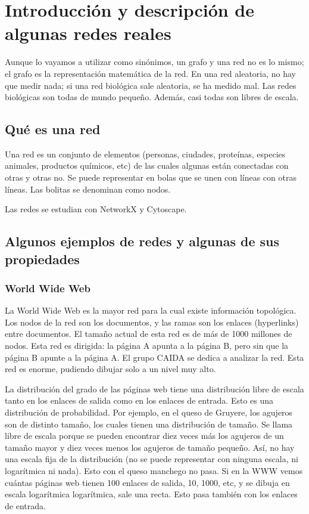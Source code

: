 \chapter{Introducción y descripción de algunas redes reales}
Aunque lo vayamos a utilizar como sinónimos, un grafo y una red no es lo mismo; el grafo es la representación matemática de la red. En una red aleatoria, no hay que medir nada; si una red biológica sale aleatoria, se ha medido mal. Las redes biológicas son todas de mundo pequeño. Además, casi todas son libres de escala. 

\section{Qué es una red}
Una red es un conjunto de elementos (personas, ciudades, proteínas, especies animales, productos químicos, etc) de las cuales algunas están conectadas con otras y otras no. Se puede representar en bolas que se unen con líneas con otras líneas. Las bolitas se denominan como nodos. 

Las redes se estudian con NetworkX y Cytoscape.

\section{Algunos ejemplos de redes y algunas de sus propiedades}
\subsection{World Wide Web}
La World Wide Web es la mayor red para la cual existe información topológica. Los nodos de la red son los documentos, y las ramas son los enlaces (hyperlinks) entre documentos. El tamaño actual de esta red es de más de 1000 millones de nodos. Esta red es dirigida: la página A apunta a la página B, pero sin que la página B apunte a la página A. 
El grupo CAIDA se dedica a analizar la red. Esta red es enorme, pudiendo dibujar solo a un nivel muy alto.

La distribución del grado de las páginas web tiene una distribución libre de escala tanto en los enlaces de salida como en los enlaces de entrada. Esto es una distribución de probabilidad. Por ejemplo, en el queso de Gruyere, los agujeros son de distinto tamaño, los cuales tienen una distribución de tamaño. Se llama libre de escala porque se pueden encontrar diez veces más los agujeros de un tamaño mayor y diez veces menos los agujeros de tamaño pequeño. Así, no hay una escala fija de la distribución (no se puede representar con ninguna escala, ni logarítmica ni nada). Esto con el queso manchego no pasa. Si en la WWW vemos cuántas páginas web tienen 100 enlaces de salida, 10, 1000, etc, y se dibuja en escala logarítmica logarítmica, sale una recta. Esto pasa también con los enlaces de entrada. 

